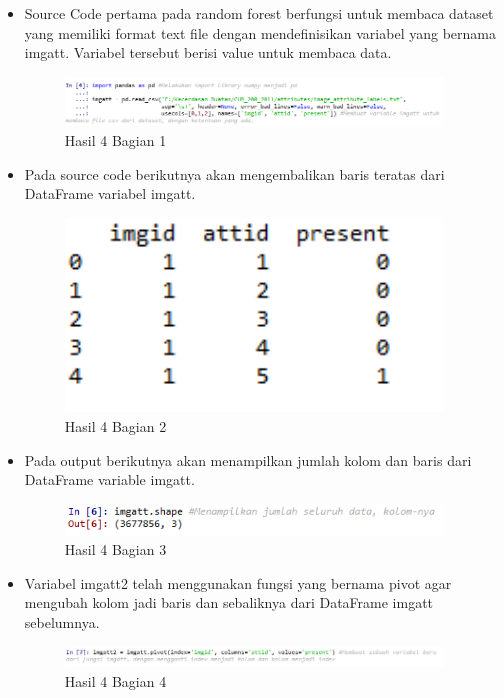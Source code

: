 \begin{itemize}
\item Source Code pertama pada random forest berfungsi untuk membaca dataset yang memiliki format text file dengan mendefinisikan variabel yang bernama imgatt. Variabel tersebut berisi value untuk membaca data.

\begin{figure}[H]
\centerline{\includegraphics[width=10cm]{figures/1174087/3/8.png}}
\caption{Hasil 4 Bagian 1}
\label{labelgambar}
\end{figure}

\item Pada source code berikutnya akan mengembalikan baris teratas dari DataFrame variabel imgatt.

\begin{figure}[H]
\centerline{\includegraphics[width=10cm]{figures/1174087/3/9.png}}
\caption{Hasil 4 Bagian 2}
\label{labelgambar}
\end{figure}

\item Pada output berikutnya akan menampilkan jumlah kolom dan baris dari DataFrame variable imgatt.

\begin{figure}[H]
\centerline{\includegraphics[width=10cm]{figures/1174087/3/10.png}}
\caption{Hasil 4 Bagian 3}
\label{labelgambar}
\end{figure}

\item Variabel imgatt2 telah menggunakan fungsi yang bernama pivot agar mengubah kolom jadi baris dan sebaliknya dari DataFrame imgatt sebelumnya.

\begin{figure}[H]
\centerline{\includegraphics[width=10cm]{figures/1174087/3/11.png}}
\caption{Hasil 4 Bagian 4}
\label{labelgambar}
\end{figure}


\end{itemize}
